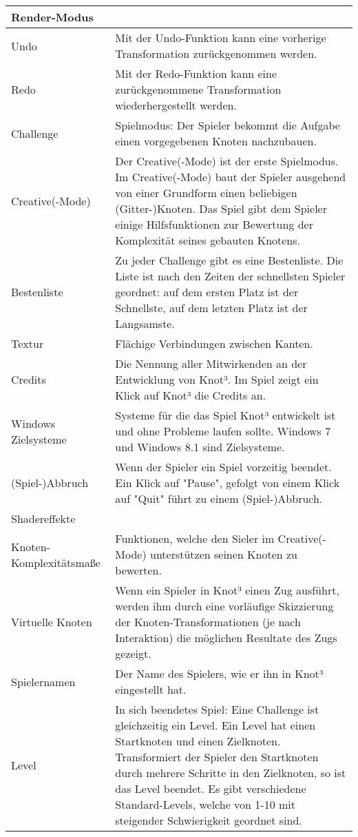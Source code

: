\begin{longtable}{|p{}|p{}|}
\hline 
Render-Modus &  %
\\
\hline
Undo & Mit der Undo-Funktion kann eine vorherige Transformation zurückgenommen werden.
\\
\hline
Redo & Mit der Redo-Funktion kann eine zurückgenommene Transformation wiederhergestellt werden.
\\
\hline
Challenge & Spielmodus: Der Spieler bekommt die Aufgabe einen vorgegebenen Knoten nachzubauen.\\
\hline
Creative(-Mode) & Der Creative(-Mode) ist der erste Spielmodus. Im Creative(-Mode) baut der Spieler ausgehend von einer Grundform einen beliebigen (Gitter-)Knoten. Das Spiel gibt dem Spieler einige Hilfsfunktionen zur Bewertung der Komplexität seines gebauten Knotens.\\
\hline
Bestenliste & Zu jeder Challenge gibt es eine Bestenliste. 
Die Liste ist nach den Zeiten der schnellsten Spieler geordnet: auf dem ersten Platz ist der Schnellste, auf dem letzten Platz ist der Langsamste.
\\
\hline
Textur & Flächige Verbindungen zwischen Kanten.\\
\hline
Credits & Die Nennung aller Mitwirkenden an der Entwicklung von Knot³. Im Spiel zeigt ein Klick auf Knot³ die Credits an.\\
\hline
Windows Zielsysteme & Systeme für die das Spiel Knot³ entwickelt ist und ohne Probleme laufen sollte. Windows 7 und Windows 8.1 sind Zielsysteme.\\
\hline
(Spiel-)Abbruch & Wenn der Spieler ein Spiel vorzeitig beendet. Ein Klick auf "Pause", gefolgt von einem Klick auf "Quit" führt zu einem (Spiel-)Abbruch.\\
\hline
Shadereffekte & \\
\hline
Knoten-Komplexitätsmaße & Funktionen, welche den Sieler im Creative(-Mode) unterstützen seinen Knoten zu bewerten.\\
\hline
Virtuelle Knoten & Wenn ein Spieler in Knot³ einen Zug ausführt, werden ihm durch eine vorläufige Skizzierung der Knoten-Transformationen (je nach Interaktion) die möglichen Resultate des Zugs gezeigt. \\
\hline
Spielernamen & Der Name des Spielers, wie er ihn in Knot³ eingestellt hat.\\
\hline
Level & In sich beendetes Spiel: Eine Challenge ist gleichzeitig ein Level. Ein Level hat einen Startknoten und einen Zielknoten. Transformiert der Spieler den Startknoten durch mehrere Schritte in den Zielknoten, so ist das Level beendet. Es gibt verschiedene Standard-Levels, welche von 1-10 mit steigender Schwierigkeit geordnet sind.\\

\end{longtable}
